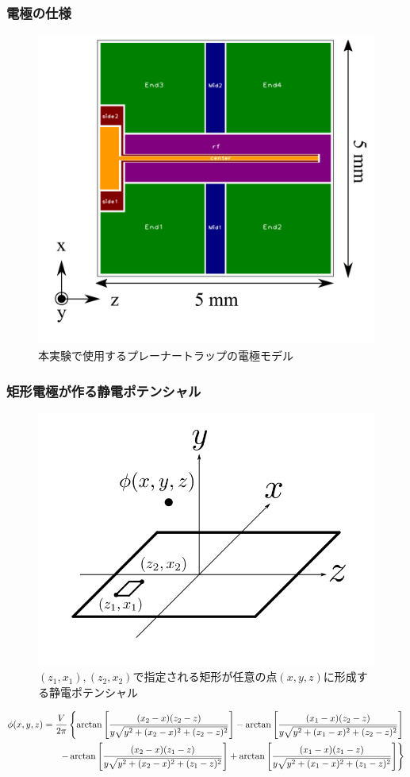 \subsubsection{電極の仕様}
\begin{figure}[h]
	\begin{center}
		\includegraphics[width = 0.5\linewidth]{./theory/figure/named_electrode.png}
		\caption{本実験で使用するプレーナートラップの電極モデル}
		\label{fig:Named_PlannerTrap}
	\end{center}
\end{figure}
\subsubsection{矩形電極が作る静電ポテンシャル}
\begin{figure}[h]
	\begin{center}
		\includegraphics[width = 0.5\linewidth]{./theory/figure/Potential_of_rect-electrode.png}
		\caption{$(z_1,x_1),(z_2,x_2)$で指定される矩形が任意の点$(x,y,z)$に形成する静電ポテンシャル}
		\label{fig:Potential_from_rect-electrode}
	\end{center}
\end{figure}
\begin{align}\label{eq:rectangle_electrode}
	\phi(x,y,z) = \frac{V}{2\pi} \left\lbrace \arctan \left[ \frac{(x_2 - x)(z_2 - z)}{y\sqrt{y^2 + (x_2 - x)^2 + (z_2 - z)^2}}\right] - \arctan \left[ \frac{(x_1 - x)(z_2 - z)}{y\sqrt{y^2 + (x_1 - x)^2 + (z_2 - z)^2}} \right]  \right.  \notag \\ 
	\left. -\arctan \left[ \frac{(x_2 - x)(z_1 - z)}{y\sqrt{y^2 + (x_2 - x)^2 + (z_1 - z)^2}}\right] + \arctan \left[ \frac{(x_1 - x)(z_1 - z)}{y\sqrt{y^2 + (x_1 - x)^2 + (z_1 - z)^2}} \right]  \right\rbrace 
\end{align}
